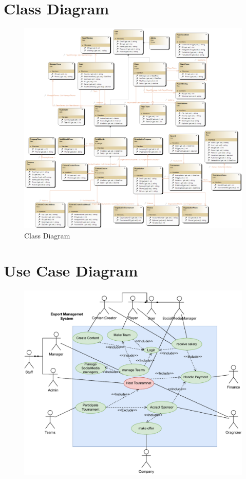 \section{Class Diagram}
\hrulefill
\begin{figure}[H]
    \centering
    \includegraphics[width=1\textwidth]{diagrams/ClassDiagram1.png}
    \caption{Class Diagram}
    \label{fig:Class Diagram}
\end{figure}

\clearpage
\section{Use Case Diagram}
\hrulefill
\begin{figure}[h]
    \centering
    \vspace{3cm}
    \includegraphics[width=1\textwidth]{diagrams/UseCaseDiagram.drawio.pdf}
    \label{fig:Use Case Diagram}
\end{figure}


